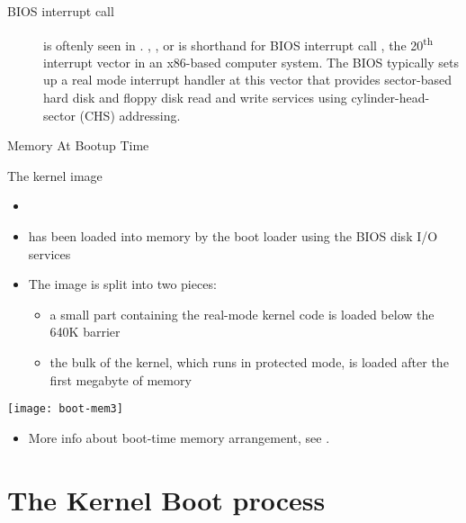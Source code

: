 \begin{description}
\item[BIOS interrupt call]  is oftenly seen in
  .  , , or 
  is shorthand for BIOS interrupt call , the 20\textsuperscript{th}
  interrupt vector in an x86-based computer system. The BIOS typically sets up a real mode
  interrupt handler at this vector that provides sector-based hard disk and floppy disk
  read and write services using cylinder-head-sector (CHS) addressing.
\end{description}

\begin{frame}{Memory At Bootup Time}
  \begin{varwidth}{.7\textwidth}
    \begin{block}{The kernel image}
      \begin{itemize}
      \item {}
      \item has been loaded into memory by the boot loader using the BIOS disk I/O
        services
      \item The image is split into two pieces:
        \begin{itemize}
        \item a small part containing the real-mode kernel code is loaded below the 640K
          barrier
        \item the bulk of the kernel, which runs in protected mode, is loaded after the
          first megabyte of memory
        \end{itemize}
      \end{itemize}
    \end{block}
  \end{varwidth}\hfill
  \begin{varwidth}{.25\textwidth}\label{boot-mem3}
    \texttt{[image: boot-mem3]}
  \end{varwidth}
\end{frame}

\begin{itemize}
\item More info about boot-time memory arrangement, see \cite{linux2.6.25protocol}.
\end{itemize}

\section{The Kernel Boot process}
\label{sec:kernel-boot-process}

